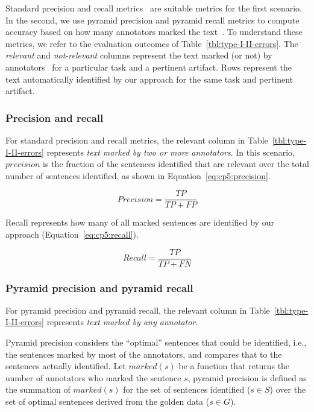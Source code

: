 Standard precision and recall metrics~\cite{Manning2009IR} are suitable metrics for the first scenario. In the second, we use pyramid precision and pyramid recall metrics
to compute accuracy based on how many annotators marked the text~\cite{Nenkova2004, Lotufo2012}. 
To understand these metrics, we refer to the evaluation outcomes of Table~\ref{tbl:type-I-II-errors}. 
The \textit{relevant} and \textit{not-relevant} columns represent the text 
marked (or not) by annotators~\cite{Lotufo2012} for a particular task and a pertinent artifact. Rows represent the text automatically identified by our approach for the same task and pertinent artifact.





\subsubsection{Precision and recall}


For standard precision and recall metrics, the relevant column in Table~\ref{tbl:type-I-II-errors} represents \textit{text marked by two or more annotators}. 
In this scenario, $precision$ is the fraction of the sentences
 identified that are relevant over the total number of sentences identified, as shown in Equation~\ref{eq:cp5:precision}.


\begin{equation}
\label{eq:cp5:precision}    
    Precision = \frac{TP}{TP + FP}
\end{equation}

\vspace{2mm}
Recall represents how many of all marked sentences are identified by our approach (Equation~\ref{eq:cp5:recall}).


\begin{equation}
\label{eq:cp5:recall}        
    Recall = \frac{TP}{TP + FN}
\end{equation}




\subsubsection{Pyramid precision and pyramid recall}


For pyramid precision and pyramid recall, the relevant column in Table~\ref{tbl:type-I-II-errors} represents \textit{text marked by any annotator}. 


Pyramid precision considers the ``optimal'' sentences that could be identified, i.e., the sentences marked by most of the annotators, and compares that to the sentences actually identified. Let $marked(s)$ be a function that returns the number of annotators who marked the sentence $s$, pyramid precision is defined as 
the summation of $marked(s)$ for the set of sentences identified ($s \in S$) over the set of optimal sentences derived from the golden data ($s \in G$).



